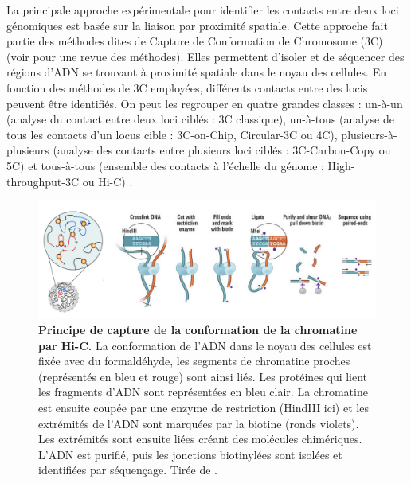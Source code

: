 La principale approche expérimentale pour identifier les contacts entre deux loci génomiques est basée sur la liaison par proximité spatiale. Cette approche fait partie des méthodes dites de Capture de Conformation de Chromosome (\acrshort{3C}) (voir \citep{han_3c_2018} pour une revue des méthodes). Elles permettent d’isoler et de séquencer des régions d’ADN se trouvant à proximité spatiale dans le noyau des cellules. En fonction des méthodes de \acrshort{3C} employées, différents contacts entre des locis peuvent être identifiés. On peut les regrouper en quatre grandes classes : un-à-un (analyse du contact entre deux loci ciblés : \acrshort{3C} classique), un-à-tous (analyse de tous les contacts d’un locus cible : \acrshort{3C}-on-Chip, Circular-\acrshort{3C} ou 4C), plusieurs-à-plusieurs (analyse des contacts entre plusieurs loci ciblés : \acrshort{3C}-Carbon-Copy ou 5C) et tous-à-tous (ensemble des contacts à l’échelle du génome : High-throughput-\acrshort{3C} ou \acrshort{Hi-C}) \citep{han_3c_2018}.\\

\begin{figure}[h]
    \centering
    \includegraphics[width=1\textwidth, page=1] {figures/introduction/fig18.png}
    \caption[Principe de capture de la conformation de la chromatine par Hi-C.]{
    \textbf{Principe de capture de la conformation de la chromatine par Hi-C.}
     La conformation de l'ADN dans le noyau des cellules est fixée avec du formaldéhyde, les segments de chromatine proches (représentés en bleu et rouge) sont ainsi liés. Les protéines qui lient les fragments d'ADN sont représentées en bleu clair. La chromatine est ensuite coupée par une enzyme de restriction (HindIII ici) et les extrémités de l'ADN sont marquées par la biotine (ronds violets). Les extrémités sont ensuite liées créant des molécules chimériques. L'ADN est purifié, puis les jonctions biotinylées sont isolées et identifiées par séquençage. Tirée de \citep{lieberman-aiden_comprehensive_2009}.\\
    }
    \label{fig:Fig18}
\end{figure}

